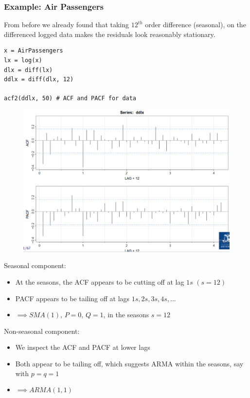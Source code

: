 \documentclass[11pt]{article}
\newcommand{\noi}{\noindent}
\begin{document}
\subsubsection{Example: Air Passengers}
\noi From before we already found that taking $12^{th}$ order difference (seasonal), on the differenced logged data makes the residuals look reasonably stationary.
\begin{lstlisting}
x = AirPassengers
lx = log(x)
dlx = diff(lx)
ddlx = diff(dlx, 12)

acf2(ddlx, 50) # ACF and PACF for data
\end{lstlisting}
\begin{figure}[H]
    \centering
    \includegraphics[width=0.8\linewidth]{air passengers data set acf and pacf plots.png}
\end{figure}

\noi Seasonal component:
\begin{itemize}
    \item At the seasons, the ACF appears to be cutting off at lag $1s$ $(s=12)$
    \item PACF appears to be tailing off at lags $1s, 2s, 3s, 4s,...$
    \item $\implies SMA(1)$, $P=0$, $Q=1$, in the seasons $s=12$ 
\end{itemize}

\noi Non-seasonal component:
\begin{itemize}
    \item We inspect the ACF and PACF at lower lags
    \item Both appear to be tailing off, which suggests ARMA within the seasons, say with $p = q = 1$
    \item $\implies ARMA(1,1)$
\end{itemize}
\end{document}
